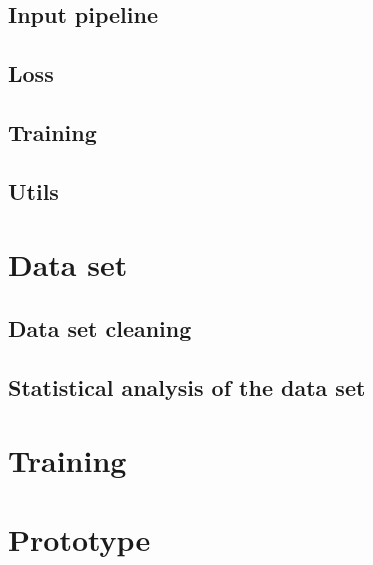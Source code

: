\subsection{Input pipeline}
\label{sub:Component-Input-pipeline}

\subsection{Loss}
\label{sub:Component-Loss}

\subsection{Training}
\label{sub:Component-Training}

\subsection{Utils}
\label{sub:Component-Utils}

\section{Data set}
\label{sec:Data-Set}

\subsection{Data set cleaning}
\label{sub:Data-Set-Cleaning}

\subsection{Statistical analysis of the data set}
\label{sub:Statistical-Analysis-Data-Set}

\section{Training}
\label{sec:Training}

\section{Prototype}
\label{sec:Prototype}
